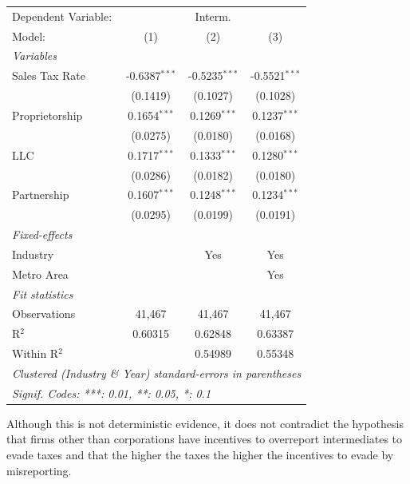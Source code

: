 \documentclass[
  12pt]{article}
\theoremstyle{definition}
\theoremstyle{remark}
\begin{document}
\begin{table}
\begin{minipage}{\linewidth}
\begingroup
\centering
\begin{tabular}{lccc}
   \tabularnewline \midrule \midrule
   Dependent Variable: & \multicolumn{3}{c}{Interm.}\\
   Model:         & (1)             & (2)             & (3)\\  
   \midrule
   \emph{Variables}\\
   Sales Tax Rate & -0.6387$^{***}$ & -0.5235$^{***}$ & -0.5521$^{***}$\\   
                  & (0.1419)        & (0.1027)        & (0.1028)\\   
   Proprietorship & 0.1654$^{***}$  & 0.1269$^{***}$  & 0.1237$^{***}$\\   
                  & (0.0275)        & (0.0180)        & (0.0168)\\   
   LLC            & 0.1717$^{***}$  & 0.1333$^{***}$  & 0.1280$^{***}$\\   
                  & (0.0286)        & (0.0182)        & (0.0180)\\   
   Partnership    & 0.1607$^{***}$  & 0.1248$^{***}$  & 0.1234$^{***}$\\   
                  & (0.0295)        & (0.0199)        & (0.0191)\\   
   \midrule
   \emph{Fixed-effects}\\
   Industry       &                 & Yes             & Yes\\  
   Metro Area     &                 &                 & Yes\\  
   \midrule
   \emph{Fit statistics}\\
   Observations   & 41,467          & 41,467          & 41,467\\  
   R$^2$          & 0.60315         & 0.62848         & 0.63387\\  
   Within R$^2$   &                 & 0.54989         & 0.55348\\  
   \midrule \midrule
   \multicolumn{4}{l}{\emph{Clustered (Industry \& Year) standard-errors in parentheses}}\\
   \multicolumn{4}{l}{\emph{Signif. Codes: ***: 0.01, **: 0.05, *: 0.1}}\\
\end{tabular}
\par\endgroup

\end{minipage}%

\end{table}%

Although this is not deterministic evidence, it does not contradict the
hypothesis that firms other than corporations have incentives to
overreport intermediates to evade taxes and that the higher the taxes
the higher the incentives to evade by misreporting.
\end{document}
